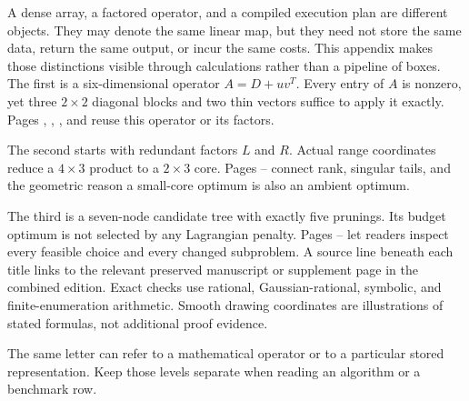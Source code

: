 A dense array, a factored operator, and a compiled execution plan are different objects. They may denote the same linear map, but they need not store the same data, return the same output, or incur the same costs. This appendix makes those distinctions visible through calculations rather than a pipeline of boxes.
The first is a six-dimensional operator $A=D+uv^T$. Every entry of $A$ is nonzero, yet three $2\times2$ diagonal blocks and two thin vectors suffice to apply it exactly. Pages , , , and  reuse this operator or its factors.

The second starts with redundant factors $L$ and $R$. Actual range coordinates reduce a $4\times3$ product to a $2\times3$ core. Pages -- connect rank, singular tails, and the geometric reason a small-core optimum is also an ambient optimum.

The third is a seven-node candidate tree with exactly five prunings. Its budget optimum is not selected by any Lagrangian penalty. Pages -- let readers inspect every feasible choice and every changed subproblem.
A source line beneath each title links to the relevant preserved manuscript or supplement page in the combined edition. Exact checks use rational, Gaussian-rational, symbolic, and finite-enumeration arithmetic. Smooth drawing coordinates are illustrations of stated formulas, not additional proof evidence.

The same letter can refer to a mathematical operator or to a particular stored representation. Keep those levels separate when reading an algorithm or a benchmark row.


